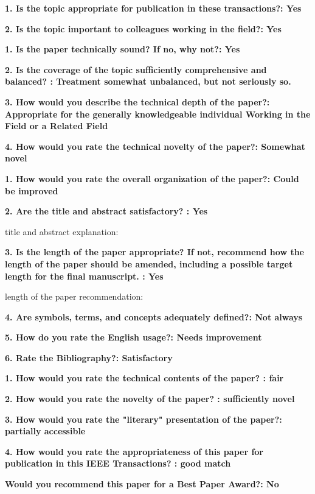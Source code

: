 \documentclass[12pt]{article}
\begin{document}
\textbf{1. Is the topic appropriate for publication in these transactions?: Yes}

\textbf{2. Is the topic important to colleagues working in the field?: Yes}

\textbf{1. Is the paper technically sound? If no, why not?: Yes}


\textbf{2. Is the coverage of the topic sufficiently comprehensive and balanced? : Treatment somewhat unbalanced, but not seriously so.}

\textbf{3. How would you describe the technical depth of the paper?: Appropriate for the generally knowledgeable individual Working in the Field or a Related Field}

\textbf{4. How would you rate the technical novelty of the paper?: Somewhat novel}

\textbf{1. How would you rate the overall organization of the paper?: Could be improved}

\textbf{2. Are the title and abstract satisfactory? : Yes}

title and abstract explanation:

\textbf{3. Is the length of the paper appropriate? If not, recommend how the length of the paper should be amended, including a possible target length for the final manuscript. : Yes}

length of the paper recommendation:

\textbf{4. Are symbols, terms, and concepts adequately defined?: Not always}

\textbf{5. How do you rate the English usage?: Needs improvement}

\textbf{6. Rate the Bibliography?: Satisfactory}

\textbf{1. How would you rate the technical contents of the paper? : fair}

\textbf{2. How would you rate the novelty of the paper? : sufficiently novel}

\textbf{3. How would you rate the "literary" presentation of the paper?: partially accessible}

\textbf{4. How would you rate the appropriateness of this paper for publication in this IEEE Transactions? : good match}

\textbf{Would you recommend this paper for a Best Paper Award?: No}
\end{document}

